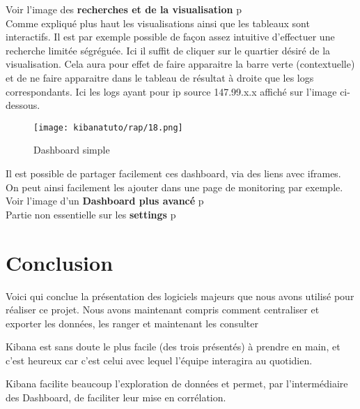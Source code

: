 Voir l'image des \textbf{recherches et de la visualisation} p\pageref{fig:kibanatuto10}\\[2mm]
Comme expliqué plus haut les visualisations ainsi que les tableaux sont interactifs.
Il est par exemple possible de façon assez intuitive d'effectuer une recherche limitée ségréguée.
Ici il suffit de cliquer sur le quartier désiré de la visualisation. Cela aura pour 
effet de faire apparaitre la barre verte (contextuelle) et de ne faire apparaitre 
dans le tableau de résultat à droite que les logs correspondants. Ici les logs ayant
pour ip source 147.99.x.x affiché sur l'image ci-dessous.

\begin{figure}[H]
\center
\texttt{[image: kibanatuto/rap/18.png]}
\label{fig:kibanatuto11}
\caption{Dashboard simple}
\end{figure}

Il est possible de partager facilement ces dashboard, via des liens avec 
iframes. On peut ainsi facilement les ajouter dans une page de monitoring par exemple.\\[2mm]
Voir l'image d'un \textbf{Dashboard plus avancé} p\pageref{fig:kibanatuto12}\\[2mm]
Partie non essentielle sur les \textbf{settings} p\pageref{subsec:settings}

\section{Conclusion}
Voici qui conclue la présentation des logiciels majeurs que nous avons
utilisé pour réaliser ce projet. Nous avons maintenant compris comment
centraliser et exporter les données, les ranger et maintenant les consulter

Kibana est sans doute le plus facile (des trois présentés) à prendre en main, et c'est heureux 
car c'est celui avec lequel l'équipe interagira au quotidien.

Kibana facilite beaucoup l'exploration de données et permet, par l'intermédiaire des Dashboard,  de faciliter leur mise en corrélation.
